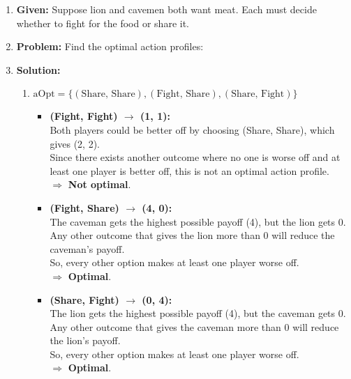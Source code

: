 \begin{example}
    \begin{enumerate}
        \item \textbf{Given:} Suppose lion and cavemen both want meat. Each must decide whether to fight for the food or share it. 
        \item \textbf{Problem:} Find the optimal action profiles: 
        \item \textbf{Solution:}
        \begin{enumerate}
            \item $\text{aOpt} = \{(\text{Share, Share}), (\text{Fight, Share}), (\text{Share, Fight})\}$
            \begin{itemize}
                \item \textbf{(Fight, Fight) $\rightarrow$ (1, 1):} \\
                Both players could be better off by choosing (Share, Share), which gives (2, 2). \\
                Since there exists another outcome where no one is worse off and at least one player is better off, this is not an optimal action profile. \\
                $\Rightarrow$ \textbf{Not optimal}.
                
                \item \textbf{(Fight, Share) $\rightarrow$ (4, 0):} \\
                The caveman gets the highest possible payoff (4), but the lion gets 0. \\
                Any other outcome that gives the lion more than 0 will reduce the caveman’s payoff. \\
                So, every other option makes at least one player worse off. \\
                $\Rightarrow$ \textbf{Optimal}.
                
                \item \textbf{(Share, Fight) $\rightarrow$ (0, 4):} \\
                The lion gets the highest possible payoff (4), but the caveman gets 0. \\
                Any other outcome that gives the caveman more than 0 will reduce the lion’s payoff. \\
                So, every other option makes at least one player worse off. \\
                $\Rightarrow$ \textbf{Optimal}.
                

\end{itemize}
\end{enumerate}
\end{enumerate}
\end{example}
